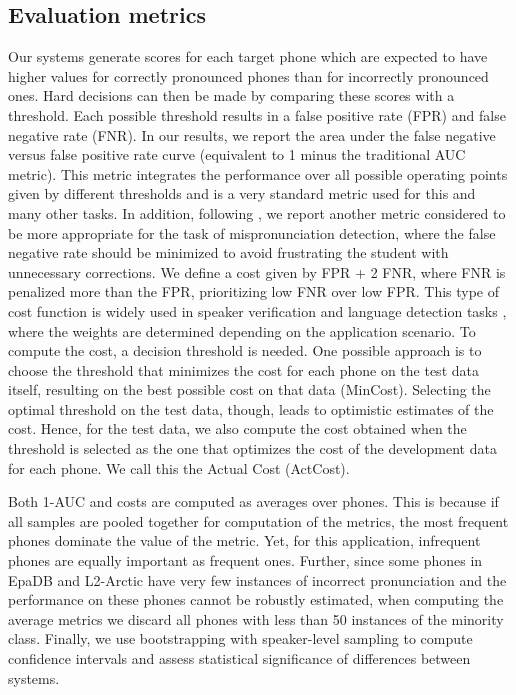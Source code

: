 \documentclass{INTERSPEECH2023}
\begin{document}
\subsection{Evaluation metrics}
\label{sec:metrics}
Our systems generate scores for each target phone which are expected to have higher values for correctly pronounced phones than for incorrectly pronounced ones. Hard decisions can then be made by comparing these scores with a threshold. Each possible threshold results in a false positive rate (FPR) and false negative rate (FNR). 
In our results, we report the area under the false negative versus false positive rate curve (equivalent to 1 minus the traditional AUC metric). This metric integrates the performance over all possible operating points given by different thresholds and is a very standard metric used for this and many other tasks.
In addition, following \cite{sancinetti2022transfer}, we report another metric considered to be more appropriate for the task of mispronunciation detection, where the false negative rate should be minimized to avoid frustrating the student with unnecessary corrections. We define a cost given by  FPR + 2 FNR, where FNR is penalized more than the FPR, prioritizing low FNR over low FPR. This type of cost function is widely used in speaker verification and language detection tasks \cite{van2007introduction}, where the weights are determined depending on the application scenario.
To compute the cost, a decision threshold is needed. One possible approach is to choose the threshold that minimizes the cost for each phone on the test data itself, resulting on the best possible cost on that data (MinCost). Selecting the optimal threshold on the test data, though, leads to optimistic estimates of the cost. Hence, for the test data, we also compute the cost obtained when the threshold is selected as the one that optimizes the cost of the development data for each phone. We call this the Actual Cost (ActCost). 

Both 1-AUC and costs are computed as averages over phones. This is because if all samples are pooled together for computation of the metrics, the most frequent phones  dominate the value of the metric. Yet, for this application, infrequent phones are equally important as frequent ones. Further, since some phones in EpaDB and L2-Arctic have very few instances of incorrect pronunciation and the performance on these phones cannot be robustly estimated, when computing the average metrics we discard all phones with less than 50 instances of the minority class. Finally, we use bootstrapping \cite{poh2007bootstrap} with speaker-level sampling to compute confidence intervals and assess statistical significance of differences between systems.
\end{document}
